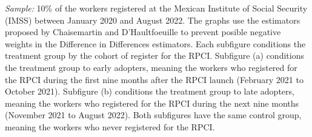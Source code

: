 \documentclass[oneside,11pt]{article}
\begin{document}
\scriptsize{
\noindent \textit{Sample:} 10\% of the workers registered at the Mexican Institute of Social Security (IMSS) between January 2020 and August 2022. The graphs use the estimators proposed by Chaisemartin and D'Haultfoeuille to prevent posible negative weights in the Difference in Differences estimators. Each subfigure conditions the treatment group by the cohort of register for the RPCI. Subfigure (a) conditions the treatment group to early adopters, meaning the workers who registered for the RPCI during the first nine months after the RPCI launch (February 2021 to October 2021). Subfigure (b) conditions the treatment group to late adopters, meaning the workers who registered for the RPCI during the next nine months (November 2021 to August 2022). Both subfigures have the same control group, meaning the workers who never registered for the RPCI.
}

\clearpage
\end{document}

